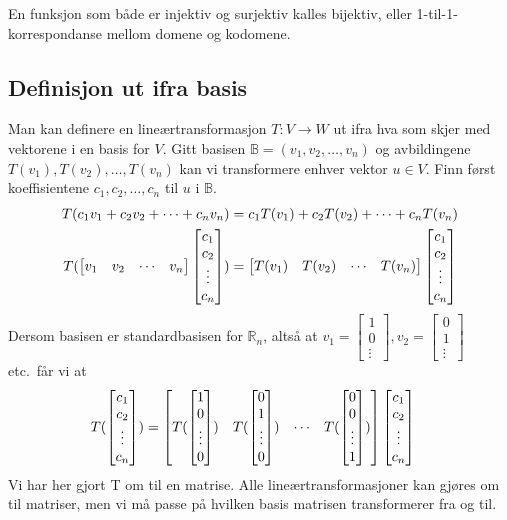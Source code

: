 \documentclass[12pt,a4paper,norsk]{article}
\makeatletter
\newcommand{\R}{\mathbb{R}}
\newcommand{\B}{\mathbb{B}}
\newcommand{\imat}[1]{\left[\begin{smallmatrix}#1\end{smallmatrix}\right]} %
\newcommand{\mat}[2]{\left[\begin{array}{@{}#1@{}}#2\end{array}\right]}
\makeatother
\begin{document}
En funksjon som både er injektiv og surjektiv kalles bijektiv, eller
1-til-1-korrespondanse mellom domene og kodomene.

\subsection{Definisjon ut ifra basis}
Man kan definere en lineærtransformasjon $T:V\rightarrow W$ ut ifra hva som
skjer med vektorene i en basis for $V$. Gitt basisen $\B = (v_{1}, v_{2}, \ldots, v_{n})$
og avbildingene $T(v_{1}), T(v_{2}), \ldots, T(v_{n})$ kan vi transformere enhver
vektor $u \in V$. Finn først koeffisientene $c_{1}, c_{2}, \ldots, c_{n}$ til $u$ i $\B$.
\begin{align*}
  T(c_{1}v_{1} + c_{2}v_{2} + \cdots + c_{n}v_{n}) &= c_{1}T(v_{1}) + c_{2}T(v_{2})+ \cdots + c_{n}T(v_{n}) \\
  T(\mat{cccc}{v_{1} & v_{2} & \cdots & v_{n}}\mat{c}{c_{1} \\ c_{2} \\ \vdots \\ c_{n}}) &= \mat{cccc}{T(v_{1}) & T(v_{2}) & \cdots & T(v_{n})}\mat{c}{c_{1} \\ c_{2} \\ \vdots \\ c_{n}}
\end{align*}
Dersom basisen er standardbasisen for $\R_{n}$, altså at
$v_{1} = \imat{1 \\ 0 \\ \vdots}, v_{2} = \imat{0 \\ 1 \\ \vdots}$ etc.\ får vi at
\begin{align*}
  T(\mat{c}{c_{1} \\ c_{2} \\ \vdots \\ c_{n}}) &= \mat{cccc}{T(\mat{c}{1 \\ 0 \\ \vdots \\ 0}) & T(\mat{c}{0 \\ 1 \\ \vdots \\ 0}) & \cdots & T(\mat{c}{0 \\ 0 \\ \vdots \\ 1})}\mat{c}{c_{1} \\ c_{2} \\ \vdots \\ c_{n}}
\end{align*}
Vi har her gjort T om til en matrise. Alle lineærtransformasjoner kan gjøres om
til matriser, men vi må passe på hvilken basis matrisen transformerer fra og
til.
\end{document}
